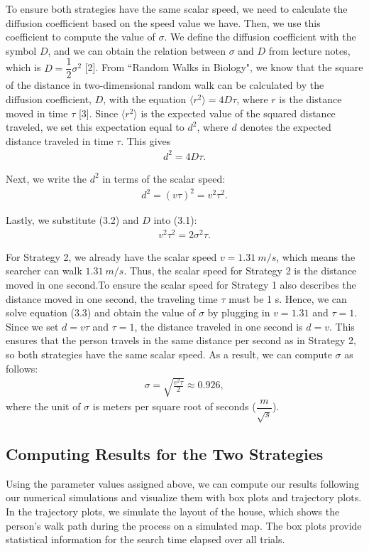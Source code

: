 \documentclass{article}
\begin{document}
\noindent To ensure both strategies have the same scalar speed, we need to calculate the diffusion coefficient based on the speed value we have. Then, we use this coefficient to compute the value of $\sigma$. We define the diffusion coefficient with the symbol $D$, and we can obtain the relation between $\sigma$ and $D$ from lecture notes, which is $D=\dfrac{1}{2}\sigma^2$ [2]. From ``Random Walks in Biology", we know that the square of the distance in two-dimensional random walk can be calculated by the diffusion coefficient, $D$, with the equation $\langle r^2 \rangle = 4D\tau$, where $r$ is the distance moved in time $\tau$ [3]. Since $\langle r^2 \rangle$ is the expected value of the squared distance traveled, we set this expectation equal to $d^2$, where $d$ denotes the expected distance traveled in time $\tau$. This gives
\begin{align}
    d^2 = 4D\tau. \tag{3.1}
\end{align}


\noindent Next, we write the $d^2$ in terms of the scalar speed:
\begin{align}
    d^2 = (v\tau)^2=v^2\tau^2. \tag{3.2}
\end{align}


\noindent Lastly, we substitute (3.2) and $D$ into (3.1):
\begin{align}
    v^2\tau^2 = 2 \sigma^2\tau.  \tag{3.3}
\end{align}

\noindent For Strategy 2, we already have the scalar speed $v = 1.31\ m/s$, which means the searcher can walk $1.31\ m/s$. Thus, the scalar speed for Strategy 2 is the distance moved in one second.To ensure the scalar speed for Strategy 1 also describes the distance moved in one second, the traveling time $\tau$ must be 1 s. Hence, we can solve equation (3.3) and obtain the value of $\sigma$ by plugging in $v = 1.31$ and $\tau  = 1$. Since we set $d = v\tau$ and  $\tau = 1$, the distance traveled in one second is $d = v$. This ensures that the person travels in the same distance per second as in Strategy 2, so both strategies have the same scalar speed. As a result, we can compute $\sigma$ as follows:
\begin{align*}
    \sigma = \sqrt{\frac{v^2\tau}{2}} \approx 0.926 ,
\end{align*}
where the unit of $\sigma$ is meters per square root of seconds ($\dfrac{m}{\sqrt{s}}$).


\subsection{Computing Results for the Two Strategies}
Using the parameter values assigned above, we can compute our results following our numerical simulations and visualize them with box plots and trajectory plots. In the trajectory plots, we simulate the layout of the house, which shows the person's walk path during the process on a simulated map. The box plots provide statistical information for the search time elapsed over all trials.
\end{document}
